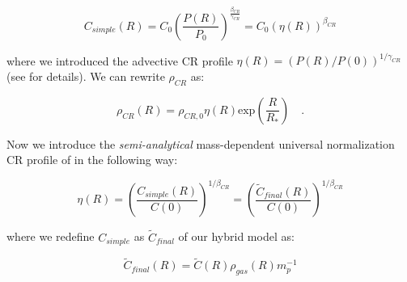\documentclass[traditabstract]{aa}
\newcommand{\rmn}{\mathrm}
\begin{document}
\begin{equation}
C_{simple}(R)=C_{0} \left( \frac{P(R)}{P_{0}} \right)^{\frac{\beta_{CR}}{\gamma_{CR}}} = C_{0} \left( \eta(R) \right)^{\beta_{CR}}
\label{eq:Csimple_1}
\end{equation} 

where we introduced the advective CR profile $\eta(R)=(P(R)/P(0))^{1/\gamma_{CR}}$ (see \citealp{2011A&A...527A..99E} for details). We can rewrite $\rho_{CR}$ as:

\begin{equation}
\rho_{CR}(R) = \rho_{CR,0} \eta(R) \rmn{exp} \left( \frac{R}{R_{*}} \right) \quad .
\label{eg:rhoCR_1}
\end{equation} 

Now we introduce the \emph{semi-analytical} mass-dependent universal normalization CR profile of \cite{2010MNRAS.409..449P} in the following way:

\begin{equation}
\eta(R) = \left( \frac{C_{simple}(R)}{C(0)} \right)^{1/\beta_{CR}} = \left( \frac{\tilde{C}_{final}(R)}{C(0)} \right)^{1/\beta_{CR}}
\label{eq:eta}
\end{equation} 

where we redefine $C_{simple}$ as $\tilde{C}_{final}$ of our hybrid model as:

\begin{equation}
\tilde{C}_{final}(R) = \tilde{C}(R) \rho_{gas}(R) m_{p}^{-1}
\label{eg:C_final}
\end{equation} 
\end{document}
